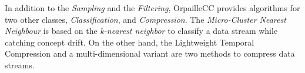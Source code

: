 \documentclass{article}
\begin{document}
In addition to the \textit{Sampling} and the \textit{Filtering}, OrpailleCC
provides algorithms for two other classes, \textit{Classification}, and
\textit{Compression}. The \textit{Micro-Cluster Nearest Neighbour} \cite{mc-nn}
is based on the \textit{k-nearest neighbor} to classify a data stream while
catching concept drift.  On the other hand, the Lightweight Temporal
Compression \cite{ltc} and a multi-dimensional variant \cite{ltcd} are two
methods to compress data streams.



\end{document}
